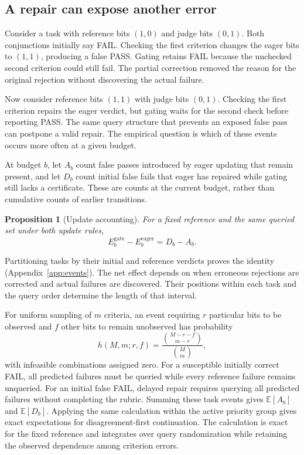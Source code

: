 \documentclass[10pt,letterpaper]{article}
\newcommand{\E}{\mathbb{E}}
\newcommand{\gate}{\mathrm{gate}}
\newcommand{\eager}{\mathrm{eager}}
\newtheorem{proposition}{Proposition}
\begin{document}
\subsection{A repair can expose another error}
Consider a task with reference bits $(1,0)$ and judge bits $(0,1)$. Both conjunctions initially say FAIL. Checking the first criterion changes the eager bits to $(1,1)$, producing a false PASS. Gating retains FAIL because the unchecked second criterion could still fail. The partial correction removed the reason for the original rejection without discovering the actual failure.

Now consider reference bits $(1,1)$ with judge bits $(0,1)$. Checking the first criterion repairs the eager verdict, but gating waits for the second check before reporting PASS. The same query structure that prevents an exposed false pass can postpone a valid repair. The empirical question is which of these events occurs more often at a given budget.

At budget $b$, let $A_b$ count false passes introduced by eager updating that remain present, and let $D_b$ count initial false fails that eager has repaired while gating still lacks a certificate. These are counts at the current budget, rather than cumulative counts of earlier transitions.
\begin{proposition}[Update accounting]\label{prop:update}
For a fixed reference and the same queried set under both update rules,
\begin{equation}\label{eq:balance}
E_b^{\gate}-E_b^{\eager}=D_b-A_b.
\end{equation}
\end{proposition}
Partitioning tasks by their initial and reference verdicts proves the identity (Appendix~\ref{app:events}). The net effect depends on when erroneous rejections are corrected and actual failures are discovered. Their positions within each task and the query order determine the length of that interval.

For uniform sampling of $m$ criteria, an event requiring $r$ particular bits to be observed and $f$ other bits to remain unobserved has probability
\begin{equation}\label{eq:event}
h(M,m;r,f)=\frac{\binom{M-r-f}{m-r}}{\binom{M}{m}},
\end{equation}
with infeasible combinations assigned zero. For a susceptible initially correct FAIL, all predicted failures must be queried while every reference failure remains unqueried. For an initial false FAIL, delayed repair requires querying all predicted failures without completing the rubric. Summing these task events gives $\E[A_b]$ and $\E[D_b]$. Applying the same calculation within the active priority group gives exact expectations for disagreement-first continuation. The calculation is exact for the fixed reference and integrates over query randomization while retaining the observed dependence among criterion errors.
\end{document}
